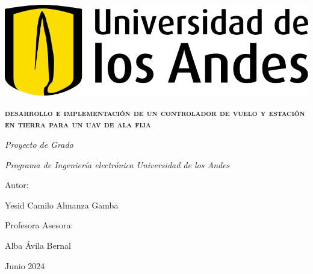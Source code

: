 \documentclass[journal,onecolumn]{IEEEtran}
\date{}
\begin{document}
    \begin{titlepage}
    \centering
    \includegraphics[scale=0.18]{Documentos/logo_uniandes.png}\\

    \vspace{1cm}
    \vspace{3cm}
    {\scshape \Large \textbf{desarrollo e implementación de un controlador de vuelo y estación en tierra para un uav de ala fija } \par}
    \vspace{3cm}
    {\itshape\Large Proyecto de Grado \par}
    \vfill
    {\itshape\Large Programa de Ingeniería electrónica Universidad de los Andes\par}
    {\Large Autor: \par}
    {\Large Yesid Camilo Almanza Gamba \par}
    \vfill
    {\Large Profesora Asesora: \par}
    {\Large Alba Ávila Bernal  \par}
    \vfill
    {\Large Junio 2024 \par}
    \end{titlepage}

\clearpage


\clearpage


\tableofcontents
\clearpage
\makeatletter
\listoffigures
\makeatother
\clearpage
\makeatletter
\listoftables
\makeatother
\clearpage

\clearpage

\clearpage


\clearpage

\clearpage

\clearpage

\clearpage

\clearpage

\clearpage

\clearpage

\clearpage

\clearpage 

\clearpage

\clearpage

\clearpage

\clearpage
%

\clearpage


\clearpage

\printbibliography
\end{document}
